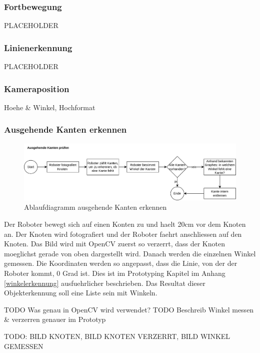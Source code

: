 \subsubsection{Fortbewegung}

PLACEHOLDER

\subsubsection{Linienerkennung}

PLACEHOLDER

\subsubsection{Kameraposition}

Hoehe \& Winkel, Hochformat

\subsubsection{Ausgehende Kanten erkennen}

\begin{figure}[H]
\centering
\includegraphics[width=\textwidth]{assets/gesamtkonzept/ablaufdiagramm-kanten-erkennen.png}
\caption{Ablaufdiagramm ausgehende Kanten erkennen}
\label{fig:ablaufdiagramm-kanten-erkennen}
\end{figure}

Der Roboter bewegt sich auf einen Konten zu und haelt 20cm vor dem Knoten an. Der Knoten wird fotografiert und der Roboter faehrt anschliessen auf den Knoten. Das Bild wird mit OpenCV zuerst so verzerrt, dass der Knoten moeglichst gerade von oben dargestellt wird. Danach werden die einzelnen Winkel gemessen. Die Koordinaten werden so angepasst, dass die Linie, von der der Roboter kommt, 0 Grad ist. Dies ist im Prototyping Kapitel im Anhang \ref{winkelerkennung} ausfuehrlicher beschrieben. Das Resultat dieser Objekterkennung soll eine Liste sein mit Winkeln.

TODO Was genau in OpenCV wird verwendet?
TODO Beschreib Winkel messen \& verzerren genauer im Prototyp

TODO: BILD KNOTEN, BILD KNOTEN VERZERRT, BILD WINKEL GEMESSEN

